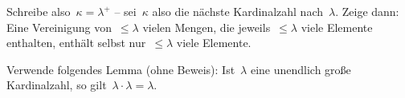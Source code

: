\documentclass{uebblatt}
\begin{document}
Schreibe also~$\kappa = \lambda^+$ -- sei~$\kappa$ also die nächste
Kardinalzahl nach~$\lambda$. Zeige dann: Eine Vereinigung von~$\leq
\lambda$ vielen Mengen, die jeweils~$\leq \lambda$ viele Elemente enthalten,
enthält selbst nur~$\leq \lambda$ viele Elemente.

Verwende folgendes Lemma (ohne Beweis): Ist~$\lambda$ eine unendlich große
Kardinalzahl, so gilt~$\lambda \cdot \lambda = \lambda$.
\end{document}
